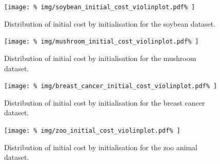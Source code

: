 \begin{table}
    \centering
    \resizebox{\textwidth}{!}{%
        
    }
    \label{tab:breast_cancer_summary}\vspace{20pt}

    \resizebox{\textwidth}{!}{%
        
    }
    \label{tab:mushroom_summary}\vspace{20pt}

    \resizebox{\textwidth}{!}{%
        
    }
    \label{tab:soybean_summary}\vspace{20pt}

    \resizebox{\textwidth}{!}{%
        
    }
    \label{tab:zoo_summary}
\end{table}

\begin{figure}
    \centering
    \texttt{[image: \%
        img/soybean\_initial\_cost\_violinplot.pdf\%
    ]}\caption{Distribution of initial cost by initialisation for the soybean
              dataset.}
\end{figure}

\begin{figure}
    \centering
    \texttt{[image: \%
        img/mushroom\_initial\_cost\_violinplot.pdf\%
    ]}\caption{Distribution of initial cost by initialisation for the mushroom
              dataset.}
\end{figure}

\begin{figure}
    \centering
    \texttt{[image: \%
        img/breast\_cancer\_initial\_cost\_violinplot.pdf\%
    ]}\caption{Distribution of initial cost by initialisation for the breast
              cancer dataset.}
\end{figure}

\begin{figure}
    \centering
    \texttt{[image: \%
        img/zoo\_initial\_cost\_violinplot.pdf\%
    ]}\caption{Distribution of initial cost by initialisation for the zoo animal
              dataset.}
\end{figure}


